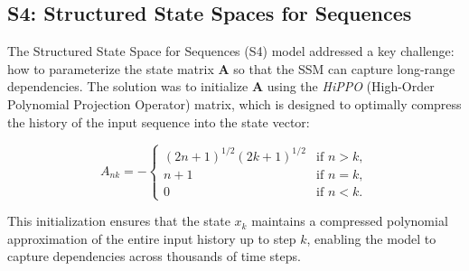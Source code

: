 \subsection{S4: Structured State Spaces for Sequences}

The Structured State Space for Sequences (S4) model \citep{gu2022s4} addressed a key challenge: how to parameterize the state matrix $\mathbf{A}$ so that the SSM can capture long-range dependencies. The solution was to initialize $\mathbf{A}$ using the \emph{HiPPO} (High-Order Polynomial Projection Operator) matrix, which is designed to optimally compress the history of the input sequence into the state vector:

\begin{equation}
A_{nk} = -\begin{cases}
(2n+1)^{1/2}(2k+1)^{1/2} & \text{if } n > k, \\
n+1 & \text{if } n = k, \\
0 & \text{if } n < k.
\end{cases}
\label{eq:hippo}
\end{equation}

This initialization ensures that the state $x_k$ maintains a compressed polynomial approximation of the entire input history up to step $k$, enabling the model to capture dependencies across thousands of time steps.

